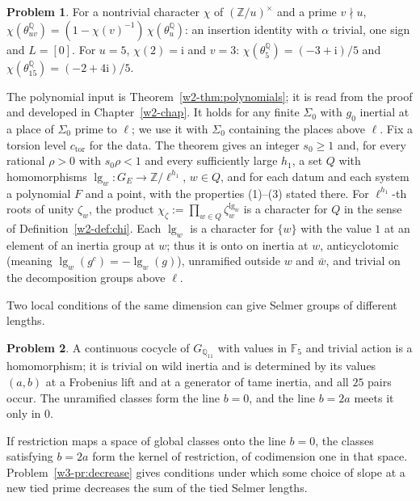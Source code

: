 \documentclass[reqno]{amsart}
\newcounter{chap}
\theoremstyle{definition}
\newtheorem{problem}{Problem}[section]
\theoremstyle{plain}
\newcommand{\Z}{\mathbb{Z}}
\newcommand{\Q}{\mathbb{Q}}
\newcommand{\ctor}{c_{\mathrm{tor}}}
\begin{document}
\begin{problem}\label{pr:insertion-model}
For a nontrivial character \(\chi\) of \((\Z/u)^\times\) and a prime \(v \nmid u\), \(\chi(\theta^{\Q}_{uv}) = (1 - \chi(v)^{-1})\,\chi(\theta^{\Q}_u)\): an insertion identity with \(\alpha\) trivial, one sign and \(L = [0]\).  For \(u = 5\), \(\chi(2) = \mathrm i\) and \(v = 3\): \(\chi(\theta^{\Q}_5) = (-3 + \mathrm i)/5\) and \(\chi(\theta^{\Q}_{15}) = (-2 + 4\mathrm i)/5\).
\end{problem}

The polynomial input is Theorem~\ref{w2-thm:polynomials}; it is read from the proof and developed in Chapter~\ref{w2-chap}.  It holds for any finite \(\Sigma_0\) with \(g_0\) inertial at a place of \(\Sigma_0\) prime to \(\ell\); we use it with \(\Sigma_0\) containing the places above \(\ell\).  Fix a torsion level \(\ctor\) for the data.  The theorem gives an integer \(s_0 \ge 1\) and, for every rational \(\rho > 0\) with \(s_0\rho < 1\) and every sufficiently large \(h_1\), a set \(Q\) with homomorphisms \(\lg_w\colon G_E \to \Z/\ell^{h_1}\), \(w \in Q\), and for each datum and each system a polynomial \(F\) and a point, with the properties (1)--(3) stated there.  For \(\ell^{h_1}\)-th roots of unity \(\zeta_w\), the product \(\chi_\zeta := \prod_{w \in Q} \zeta_w^{\lg_w}\) is a character for \(Q\) in the sense of Definition~\ref{w2-def:chi}.  Each \(\lg_w\) is a character for \(\{w\}\) with the value \(1\) at an element of an inertia group at \(w\); thus it is onto on inertia at \(w\), anticyclotomic (meaning \(\lg_w(g^c) = -\lg_w(g)\)), unramified outside \(w\) and \(\bar w\), and trivial on the decomposition groups above \(\ell\).

Two local conditions of the same dimension can give Selmer groups of different lengths.

\begin{problem}\label{pr:tilted-line}
A continuous cocycle of \(G_{\Q_{11}}\) with values in \(\mathbb F_5\) and trivial action is a homomorphism; it is trivial on wild inertia and is determined by its values \((a, b)\) at a Frobenius lift and at a generator of tame inertia, and all \(25\) pairs occur.  The unramified classes form the line \(b = 0\), and the line \(b = 2a\) meets it only in \(0\).
\end{problem}

If restriction maps a space of global classes onto the line \(b = 0\), the classes satisfying \(b = 2a\) form the kernel of restriction, of codimension one in that space.  Problem~\ref{w3-pr:decrease} gives conditions under which some choice of slope at a new tied prime decreases the sum of the tied Selmer lengths.
\end{document}
